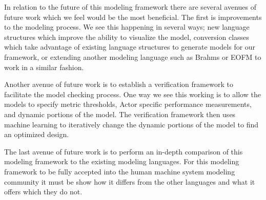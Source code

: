 In relation to the future of this modeling framework there are several avenues of future work which we feel would be the most beneficial.  The first is improvements to the modeling process.  We see this happening in several ways; new language structures which improve the ability to visualize the model, conversion classes which take advantage of existing language structures to generate models for our framework, or extending another modeling language such as Brahms or EOFM to work in a similar fashion.

Another avenue of future work is to establish a verification framework to facilitate the model checking process.  One way we see this working is to allow the models to specify metric thresholds, Actor specific performance measurements, and dynamic portions of the model.  The verification framework then uses machine learning to iteratively change the dynamic portions of the model to find an optimized design.

The last avenue of future work is to perform an in-depth comparison of this modeling framework to the existing modeling languages.  For this modeling framework to be fully accepted into the human machine system modeling community it must be show how it differs from the other languages and what it offers which they do not.  

